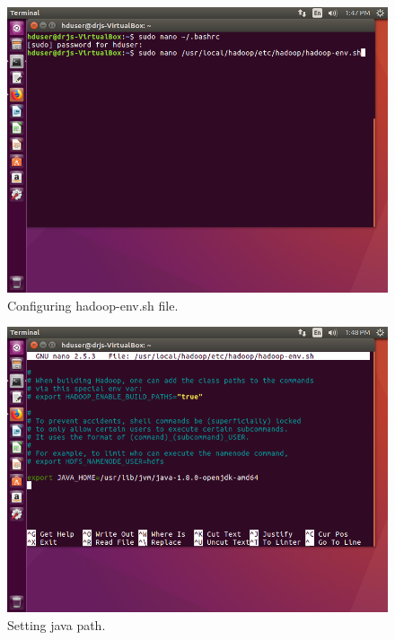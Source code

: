 \documentclass[a4paper,10pt]{article}
\begin{document}
\begin{figure}[h]
	\includegraphics[scale=0.33,center]{6.png}
	\caption{Configuring hadoop-env.sh file.}
	\label{fig:07}
\end{figure}

\begin{figure}[h]
	\includegraphics[scale=0.33,center]{7.png}
	\caption{Setting java path.}
	\label{fig:08}
\end{figure}
\end{document}
